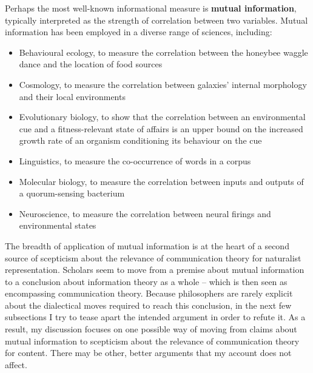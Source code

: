 \documentclass[12pt]{article}
\begin{document}


Perhaps the most well-known informational measure is \textbf{mutual information}, typically interpreted as the strength of correlation between two variables.
Mutual information has been employed in a diverse range of sciences, including:

\begin{itemize}
    \item Behavioural ecology, to measure the correlation between the honeybee waggle dance and the location of food sources \citep{haldane1954statistical}
    \item Cosmology, to measure the correlation between galaxies' internal morphology and their local environments \citep{pandey2017how}
    \item Evolutionary biology, to show that the correlation between an environmental cue and a fitness-relevant state of affairs is an upper bound on the increased growth rate of an organism conditioning its behaviour on the cue \citep{donaldson-matasci2010fitness}
    \item Linguistics, to measure the co-occurrence of words in a corpus \citep[$\S$4]{hunston2002corpora}
    \item Molecular biology, to measure the correlation between inputs and outputs of a quorum-sensing bacterium \citep{mehta2009information}
    \item Neuroscience, to measure the correlation between neural firings and environmental states \citep[][and references therein]{rathkopf2017neural}
\end{itemize}

\noindent The breadth of application of mutual information is at the heart of a second source of scepticism about the relevance of communication theory for naturalist representation.
Scholars seem to move from a premise about mutual information to a conclusion about information theory as a whole -- which is then seen as encompassing communication theory.
Because philosophers are rarely explicit about the dialectical moves required to reach this conclusion, in the next few subsections I try to tease apart the intended argument in order to refute it.
As a result, my discussion focuses on one possible way of moving from claims about mutual information to scepticism about the relevance of communication theory for content.
There may be other, better arguments that my account does not affect.

\end{document}
